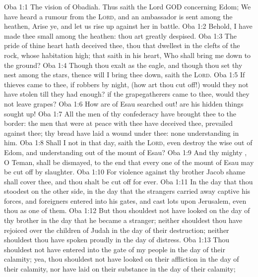 \vs Oba 1:1 The vision of Obadiah. Thus saith the Lord GOD concerning Edom; We have heard a rumour from the \textsc{Lord}, and an ambassador is sent among the heathen, Arise ye, and let us rise up against her in battle.
\vs Oba 1:2 Behold, I have made thee small among the heathen: thou art greatly despised.
\vs Oba 1:3 The pride of thine heart hath deceived thee, thou that dwellest in the clefts of the rock, whose habitation  high; that saith in his heart, Who shall bring me down to the ground?
\vs Oba 1:4 Though thou exalt  as the eagle, and though thou set thy nest among the stars, thence will I bring thee down, saith the \textsc{Lord}.
\vs Oba 1:5 If thieves came to thee, if robbers by night, (how art thou cut off!) would they not have stolen till they had enough? if the grapegatherers came to thee, would they not leave  grapes?
\vs Oba 1:6 How are  of Esau searched out!  are his hidden things sought up!
\vs Oba 1:7 All the men of thy confederacy have brought thee  to the border: the men that were at peace with thee have deceived thee,  prevailed against thee;  thy bread have laid a wound under thee:  none understanding in him.
\vs Oba 1:8 Shall I not in that day, saith the \textsc{Lord}, even destroy the wise  out of Edom, and understanding out of the mount of Esau?
\vs Oba 1:9 And thy mighty , O Teman, shall be dismayed, to the end that every one of the mount of Esau may be cut off by slaughter.
\vs Oba 1:10 For  violence against thy brother Jacob shame shall cover thee, and thou shalt be cut off for ever.
\vs Oba 1:11 In the day that thou stoodest on the other side, in the day that the strangers carried away captive his forces, and foreigners entered into his gates, and cast lots upon Jerusalem, even thou  as one of them.
\vs Oba 1:12 But thou shouldest not have looked on the day of thy brother in the day that he became a stranger; neither shouldest thou have rejoiced over the children of Judah in the day of their destruction; neither shouldest thou have spoken proudly in the day of distress.
\vs Oba 1:13 Thou shouldest not have entered into the gate of my people in the day of their calamity; yea, thou shouldest not have looked on their affliction in the day of their calamity, nor have laid  on their substance in the day of their calamity;
